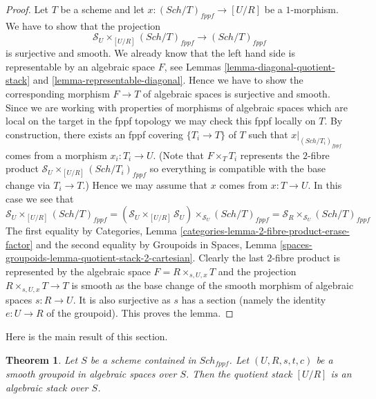 \documentclass{stacks-project}
\theoremstyle{plain}
\newtheorem{theorem}[subsection]{Theorem}
\theoremstyle{definition}
\theoremstyle{remark}
\numberwithin{equation}{subsection}
\def\Sch{\mathit{Sch}}
\begin{document}
\begin{proof}
Let $T$ be a scheme and let $x : (\Sch/T)_{fppf} \to [U/R]$
be a $1$-morphism. We have to show that the projection
$$
\mathcal{S}_U \times_{[U/R]} (\Sch/T)_{fppf}
\longrightarrow
(\Sch/T)_{fppf}
$$
is surjective and smooth. We already know that the left hand side
is representable by an algebraic space $F$, see
Lemmas \ref{lemma-diagonal-quotient-stack} and
\ref{lemma-representable-diagonal}.
Hence we have to show the corresponding morphism $F \to T$ of
algebraic spaces is surjective and smooth.
Since we are working with properties of morphisms of algebraic
spaces which are local on the target in the fppf topology we
may check this fppf locally on $T$. By construction, there exists
an fppf covering $\{T_i \to T\}$ of $T$ such that
$x|_{(\Sch/T_i)_{fppf}}$ comes from a morphism
$x_i : T_i \to U$. (Note that $F \times_T T_i$ represents the
$2$-fibre product $\mathcal{S}_U \times_{[U/R]} (\Sch/T_i)_{fppf}$
so everything is compatible with the base change via $T_i \to T$.)
Hence we may assume that $x$ comes from $x : T \to U$.
In this case we see that
$$
\mathcal{S}_U \times_{[U/R]} (\Sch/T)_{fppf}
=
(\mathcal{S}_U \times_{[U/R]} \mathcal{S}_U)
\times_{\mathcal{S}_U} (\Sch/T)_{fppf}
=
\mathcal{S}_R \times_{\mathcal{S}_U} (\Sch/T)_{fppf}
$$
The first equality by
Categories, Lemma \ref{categories-lemma-2-fibre-product-erase-factor}
and the second equality by
Groupoids in Spaces,
Lemma \ref{spaces-groupoids-lemma-quotient-stack-2-cartesian}.
Clearly the last $2$-fibre product is represented by the algebraic
space $F = R \times_{s, U, x} T$ and the projection
$R \times_{s, U, x} T \to T$ is smooth as the base change of
the smooth morphism of algebraic spaces $s : R \to U$.
It is also surjective as $s$ has a section (namely the identity
$e : U \to R$ of the groupoid).
This proves the lemma.
\end{proof}

\noindent
Here is the main result of this section.

\begin{theorem}
\label{theorem-smooth-groupoid-gives-algebraic-stack}
Let $S$ be a scheme contained in $\Sch_{fppf}$.
Let $(U, R, s, t, c)$ be a smooth groupoid in algebraic spaces over $S$.
Then the quotient stack $[U/R]$ is an algebraic stack over $S$.
\end{theorem}
\end{document}
